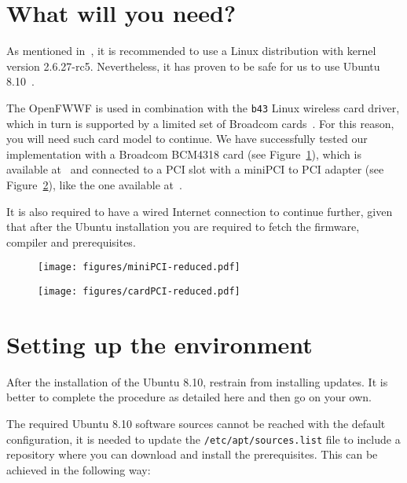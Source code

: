 \documentclass[conference]{IEEEtran}
\begin{document}
\section{What will you need?}\label{hardware}
As mentioned in~\cite{OpenFWWF}, it is recommended to use a Linux distribution with kernel version 2.6.27-rc5. 
Nevertheless, it has proven to be safe for us to use Ubuntu 8.10~\cite{ubuntu8}.

The OpenFWWF is used in combination with the \texttt{b43} Linux wireless card driver, which in turn is supported by a limited set of Broadcom cards~\cite{b43-info}. For this reason, you will need such card model to continue. We have successfully tested our implementation with a Broadcom BCM4318 card (see Figure~\ref{fig:miniPCI}), which is available at~\cite{bcm4318} and connected to a PCI slot with a miniPCI to PCI adapter (see Figure~\ref{fig:PCI}), like the one available at~\cite{PCIAdapter}.

It is also required to have a wired Internet connection to continue further, given that after the Ubuntu installation you are required to fetch the firmware, compiler and prerequisites.

\begin{figure*}[t]
\centering
\begin{subfigure}{.5\textwidth}
  \centering
  \texttt{[image: figures/miniPCI-reduced.pdf]}
  \caption{}
  \label{fig:miniPCI}
\end{subfigure}%
\begin{subfigure}{.5\textwidth}
  \centering
  \texttt{[image: figures/cardPCI-reduced.pdf]}
  \caption{}
  \label{fig:PCI}
\end{subfigure}
\caption{\ref{fig:miniPCI}) Broadcom BCM418 miniPCI. \ref{fig:PCI}) Card correctly placed into the PCI adapter.}
\label{installedCard}
\end{figure*}

\section{Setting up the environment}
After the installation of the Ubuntu 8.10, restrain from installing updates. It is better to complete the procedure as detailed here and then go on your own.

The required Ubuntu 8.10 software sources cannot be reached with the default configuration, it is needed to update the \texttt{/etc/apt/sources.list} file to include a repository where you can download and install the prerequisites. This can be achieved in the following way: 
\end{document}
